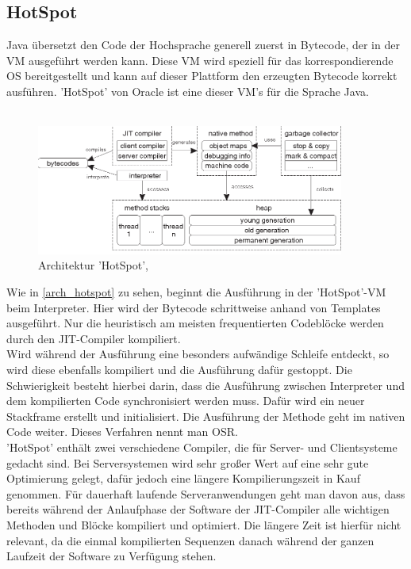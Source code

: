 \subsection{HotSpot}
Java übersetzt den Code der Hochsprache generell zuerst in Bytecode, der in der \ac{VM} ausgeführt werden kann. Diese \ac{VM} wird speziell für das korrespondierende \ac{OS} bereitgestellt und kann auf dieser Plattform den erzeugten Bytecode korrekt ausführen. 'HotSpot' von Oracle ist eine dieser \ac{VM}'s für die Sprache Java.\\
\\
\begin{figure}[ht]
    \begin{center}
        \includegraphics[width=0.9\textwidth]{assets/img/3-Figure1-1.png}
        \caption{Architektur 'HotSpot', \cite[Quelle: Kotzmann Wimmer 2008]{KotzmannWimmer2008}}
        \label{arch_hotspot}
    \end{center}
\end{figure}
Wie in \autoref{arch_hotspot} zu sehen, beginnt die Ausführung in der 'HotSpot'-\ac{VM} beim Interpreter. Hier wird der Bytecode schrittweise anhand von Templates ausgeführt. Nur die heuristisch am meisten frequentierten Codeblöcke werden durch den \ac{JIT}-Compiler kompiliert.\\
Wird während der Ausführung eine besonders aufwändige Schleife entdeckt, so wird diese ebenfalls kompiliert und die Ausführung dafür gestoppt. Die Schwierigkeit besteht hierbei darin, dass die Ausführung zwischen Interpreter und dem kompilierten Code synchronisiert werden muss. Dafür wird ein neuer Stackframe erstellt und initialisiert. Die Ausführung der Methode geht im nativen Code weiter. Dieses Verfahren nennt man \ac{OSR}.\\
'HotSpot' enthält zwei verschiedene Compiler, die für Server- und Clientsysteme gedacht sind. Bei Serversystemen wird sehr großer Wert auf eine sehr gute Optimierung gelegt, dafür jedoch eine längere Kompilierungszeit in Kauf genommen. Für dauerhaft laufende Serveranwendungen geht man davon aus, dass bereits während der Anlaufphase der Software der \ac{JIT}-Compiler alle wichtigen Methoden und Blöcke kompiliert und optimiert. Die längere Zeit ist hierfür nicht relevant, da die einmal kompilierten Sequenzen danach während der ganzen Laufzeit der Software zu Verfügung stehen.\\
